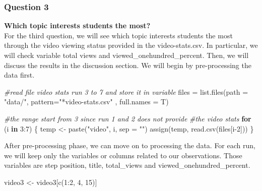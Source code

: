 \documentclass[12pt,]{article}
\newenvironment{Shaded}{\begin{snugshade}}{\end{snugshade}}
\newcommand{\AttributeTok}[1]{\textcolor[rgb]{0.77,0.63,0.00}{#1}}
\newcommand{\CommentTok}[1]{\textcolor[rgb]{0.56,0.35,0.01}{\textit{#1}}}
\newcommand{\ControlFlowTok}[1]{\textcolor[rgb]{0.13,0.29,0.53}{\textbf{#1}}}
\newcommand{\DecValTok}[1]{\textcolor[rgb]{0.00,0.00,0.81}{#1}}
\newcommand{\FunctionTok}[1]{\textcolor[rgb]{0.00,0.00,0.00}{#1}}
\newcommand{\NormalTok}[1]{#1}
\newcommand{\OtherTok}[1]{\textcolor[rgb]{0.56,0.35,0.01}{#1}}
\newcommand{\SpecialCharTok}[1]{\textcolor[rgb]{0.00,0.00,0.00}{#1}}
\newcommand{\StringTok}[1]{\textcolor[rgb]{0.31,0.60,0.02}{#1}}
\begin{document}
\hypertarget{question-3}{%
\subsubsection{Question 3}\label{question-3}}

\textbf{Which topic interests students the most?}\\
\hfill\break For the third question, we will see which topic interests
students the most through the video viewing status provided in the
video-stats.csv. In particular, we will check variable total views and
viewed\_onehundred\_percent. Then, we will discuss the results in the
discussion section. We will begin by pre-processing the data first.

\begin{Shaded}
\begin{Highlighting}[]
\CommentTok{\#read file video stats run 3 to 7 and store it in variable}
\NormalTok{files }\OtherTok{=} \FunctionTok{list.files}\NormalTok{(}\AttributeTok{path =} \StringTok{"data/"}\NormalTok{, }
                   \AttributeTok{pattern=}\StringTok{"*video{-}stats.csv"}
\NormalTok{                   , }\AttributeTok{full.names =}\NormalTok{ T)}

\CommentTok{\#the range start from 3 since run 1 and 2 does not provide }
\CommentTok{\#the video stats}
\ControlFlowTok{for}\NormalTok{ (i }\ControlFlowTok{in} \DecValTok{3}\SpecialCharTok{:}\DecValTok{7}\NormalTok{) \{}
\NormalTok{  temp }\OtherTok{\textless{}{-}} \FunctionTok{paste}\NormalTok{(}\StringTok{"video"}\NormalTok{, i, }\AttributeTok{sep =} \StringTok{""}\NormalTok{)}
  \FunctionTok{assign}\NormalTok{(temp, }\FunctionTok{read.csv}\NormalTok{(files[i}\DecValTok{{-}2}\NormalTok{]))}
\NormalTok{\}}
\end{Highlighting}
\end{Shaded}

After pre-processing phase, we can move on to processing the data. For
each run, we will keep only the variables or columns related to our
observations. Those variables are step position, title, total\_views and
viewed\_onehundred\_percent.

\begin{Shaded}
\begin{Highlighting}[]
\NormalTok{video3 }\OtherTok{\textless{}{-}}\NormalTok{ video3[}\FunctionTok{c}\NormalTok{(}\DecValTok{1}\SpecialCharTok{:}\DecValTok{2}\NormalTok{, }\DecValTok{4}\NormalTok{, }\DecValTok{15}\NormalTok{)]}
\end{Highlighting}
\end{Shaded}
\end{document}

